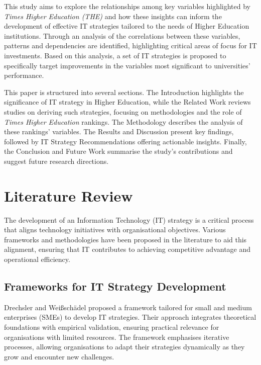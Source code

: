 \documentclass[sigconf]{acmart}
\begin{document}
This study aims to explore the relationships among key variables highlighted by \textit{Times Higher Education (THE)} and how these insights can inform the development of effective IT strategies tailored to the needs of Higher Education institutions. Through an analysis of the correlations between these variables, patterns and dependencies are identified, highlighting critical areas of focus for IT investments. Based on this analysis, a set of IT strategies is proposed to specifically target improvements in the variables most significant to universities' performance.

This paper is structured into several sections. The Introduction highlights the significance of IT strategy in Higher Education, while the Related Work reviews studies on deriving such strategies, focusing on methodologies and the role of \textit{Times Higher Education} rankings. The Methodology describes the analysis of these rankings' variables. The Results and Discussion present key findings, followed by IT Strategy Recommendations offering actionable insights. Finally, the Conclusion and Future Work summarise the study's contributions and suggest future research directions.


\section{Literature Review}
\label{sec:literature_review}

The development of an Information Technology (IT) strategy is a critical process that aligns technology initiatives with organisational objectives. Various frameworks and methodologies have been proposed in the literature to aid this alignment, ensuring that IT contributes to achieving competitive advantage and operational efficiency.

\subsection{Frameworks for IT Strategy Development}

Drechsler and Weißschädel \cite{drechsler2018framework} proposed a framework tailored for small and medium enterprises (SMEs) to develop IT strategies. Their approach integrates theoretical foundations with empirical validation, ensuring practical relevance for organisations with limited resources. The framework emphasises iterative processes, allowing organisations to adapt their strategies dynamically as they grow and encounter new challenges.
\end{document}
